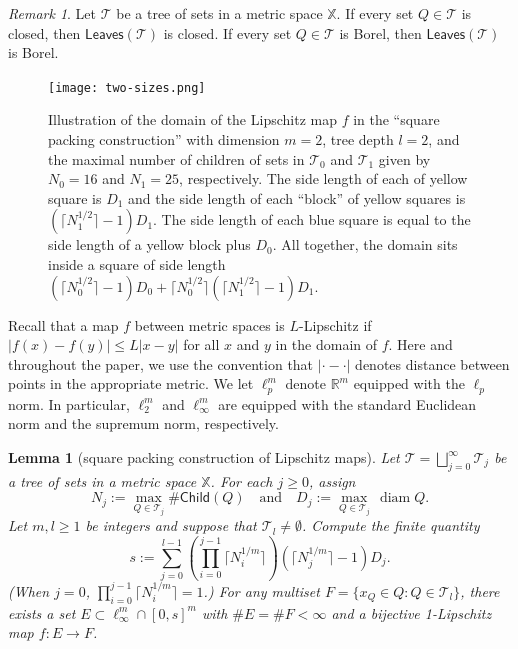 \documentclass[12pt]{amsart}
\newtheorem{lemma}[theorem]{Lemma}
\theoremstyle{definition}
\theoremstyle{remark}
\newtheorem{remark}[theorem]{Remark}
\newcommand{\RR}{\mathbb{R}}
\newcommand{\XX}{\mathbb{X}}
\newcommand{\diam}{\mathop\mathrm{diam}\nolimits}
\newcommand{\leaves}{\mathsf{Leaves}}
\newcommand{\Child}{\mathsf{Child}}
\numberwithin{figure}{section}
\numberwithin{equation}{section}
\begin{document}
\begin{remark}Let $\mathcal{T}$ be a tree of sets in a metric space $\XX$. If every set $Q\in\mathcal{T}$ is closed, then $\leaves(\mathcal{T})$ is closed. If every set $Q\in\mathcal{T}$ is Borel, then $\leaves(\mathcal{T})$ is Borel.
\end{remark}

\begin{figure}\begin{center}\texttt{[image: two-sizes.png]}\end{center}\caption{Illustration of the domain of the Lipschitz map $f$ in the ``square packing construction'' with dimension $m=2$, tree depth $l=2$, and the maximal number of children of sets in $\mathcal{T}_0$ and $\mathcal{T}_1$ given by $N_0=16$ and $N_1=25$, respectively. The side length of each of yellow square is $D_1$ and the side length of each ``block'' of yellow squares is $(\lceil N_1^{1/2}\rceil -1)D_1$. The side length of each blue square is equal to the side length of a yellow block plus $D_0$. All together, the domain sits inside a square of side length $(\lceil N_0^{1/2}\rceil-1)D_0+\lceil N_0^{1/2}\rceil(\lceil N_1^{1/2}\rceil-1) D_1$.}\label{fig:two-sizes}\end{figure}

Recall that a map $f$ between metric spaces is $L$-Lipschitz if $|f(x)-f(y)|\leq L|x-y|$ for all $x$ and $y$ in the domain of $f$. Here and throughout the paper, we use the convention that $|\cdot-\cdot|$ denotes distance between points in the appropriate metric. We let $\ell^m_p$ denote $\RR^m$ equipped with the $\ell_p$ norm. In particular, $\ell^m_2$  and $\ell^m_\infty$ are equipped with the standard Euclidean norm and the supremum norm, respectively.

\begin{lemma}[square packing construction of Lipschitz maps] \label{l:pack} Let $\mathcal{T}=\bigsqcup_{j=0}^\infty \mathcal{T}_j$ be a tree of sets in a metric space $\XX$. For each $j\geq 0$, assign \begin{equation}\label{N-def} N_j:=\max_{Q\in\mathcal{T}_j}\#\Child(Q)\quad \text{and}\quad D_j:=\max_{Q\in\mathcal{T}_j}\,\diam Q.\end{equation}  Let $m,l\geq 1$ be integers and suppose that $\mathcal{T}_l\neq\emptyset$. Compute the finite quantity \begin{equation}\label{S-condition} s:=\sum_{j=0}^{l-1}\left(\prod_{i=0}^{j-1} \lceil N_i^{1/m}\rceil\right) (\lceil N_j^{1/m}\rceil-1)D_j.\end{equation} (When $j=0$, $\prod_{i=0}^{j-1} \lceil N_i^{1/m}\rceil=1$.) For any multiset $F=\{x_Q\in Q:Q\in\mathcal{T}_l\}$, there exists a set $E\subset \ell_\infty^m\cap [0,s]^m$ with $\#E=\#F<\infty$ and a bijective 1-Lipschitz map $f:E\rightarrow F$.

 \end{lemma}
\end{document}
